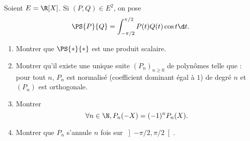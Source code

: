\begin{enonce}
\begin{exercise}[ID={RMS122 E941},subtitle={Oral Centrale PSI 2011},tags={mpsi}, difficulty={0}]
Soient $E=\R[X]$.
Si $(P,Q)\in E^2$, on pose 
\begin{equation*}
  \PS{P}{Q}=\int_{-\pi/2}^{\pi/2} P(t)Q(t)\cos t\d t.
\end{equation*}
\begin{enumerate}
  \item Montrer que $\PS{*}{*}$ est une produit scalaire.
  \item Montrer qu'il existe une unique suite $(P_n)_{n\geq0}$ de polynômes telle que : pour tout $n$, $P_n$ est normalisé (coefficient dominant égal à $1$) de degré $n$ et $(P_n)$ est orthogonale.
  \item Montrer
    \begin{equation*}
      \forall n\in\N, P_n(-X)=(-1)^n P_n(X).
    \end{equation*}
\item Montrer que $P_n$ s'annule $n$ fois sur $\left]-\pi/2,\pi/2\right[$.
\end{enumerate}
\end{exercise}
\begin{solution}
\end{solution}
\end{enonce}
